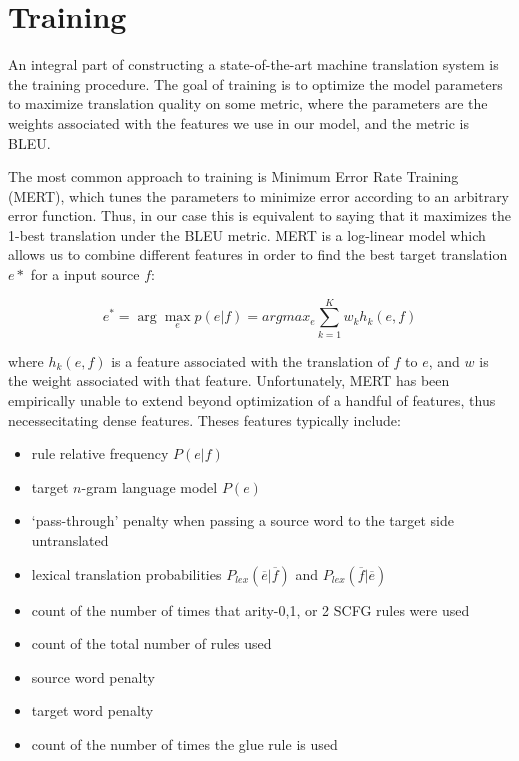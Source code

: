 \chapter{Training}

An integral part of constructing a state-of-the-art machine translation system is the training procedure. The goal of training is to optimize the model parameters to maximize translation quality on some metric, where the parameters are the weights associated with the features we use in our model, and the metric is BLEU. 

The most common approach to training is Minimum Error Rate Training (MERT), which tunes the parameters to minimize error according to an arbitrary error function. Thus, in our case this is equivalent to saying that it maximizes the 1-best translation under the BLEU metric. MERT is a log-linear model which allows us to combine different features in order to find the best target translation $e*$ for a input source $f$:

\begin{equation}
e^* = \arg \max_e p(e|f) = argmax_e \sum_{k=1}^K w_kh_k(e,f)
\end{equation}

where $h_k(e,f)$ is a feature associated with the translation of $f$ to $e$, and $w$ is the weight associated with that feature. Unfortunately, MERT has been empirically unable to extend beyond optimization of a handful of features, thus necessecitating dense features. Theses features typically include:

\begin{itemize}
\item rule relative frequency $P(e|f)$
\item target $n$-gram language model $P(e)$
\item `pass-through' penalty when passing a source word to the target side untranslated
\item lexical translation probabilities $P_{lex}(\overline{e}|\overline{f})$ and $P_{lex}(\overline{f}|\overline{e})$
\item count of the number of times that arity-0,1, or 2 SCFG rules were used 
\item count of the total number of rules used
\item source word penalty
\item target word penalty
\item count of the number of times the glue rule is used 
\end{itemize} 

